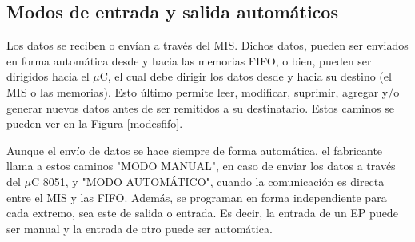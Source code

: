 %	

\subsection{Modos de entrada y salida automáticos}
	
	Los datos se reciben o envían a través del MIS. Dichos datos, pueden ser enviados en forma automática desde y hacia las memorias FIFO, o bien, pueden ser dirigidos hacia el $\mu$C, el cual debe dirigir los datos desde y hacia su destino (el MIS o las memorias). Esto último permite leer, modificar, suprimir, agregar y/o generar nuevos datos antes de ser remitidos a su destinatario. Estos caminos se pueden ver en la Figura \ref{modesfifo}.%
	
	Aunque el envío de datos se hace siempre de forma automática, el fabricante llama a estos caminos "MODO MANUAL", en caso de enviar los datos a través del $\mu$C 8051, y "MODO AUTOMÁTICO", cuando la comunicación es directa entre el MIS y las FIFO. Además, se programan en forma independiente para cada extremo, sea este de salida o entrada. Es decir, la entrada de un EP puede ser manual y la entrada de otro puede ser automática.%
	
